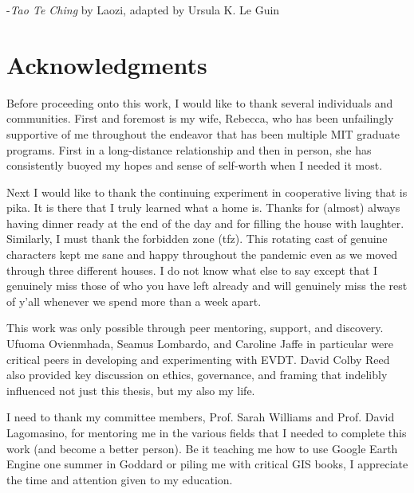 \hspace{40mm}-\textit{Tao Te Ching} by Laozi, adapted by Ursula K. Le Guin


\normalsize
\vfill
\hspace{0pt}

\cleardoublepage

\section*{Acknowledgments}

 

Before proceeding onto this work, I would like to thank several individuals and communities. First and foremost is my wife, Rebecca, who has been unfailingly supportive of me throughout the endeavor that has been multiple MIT graduate programs. First in a long-distance relationship and then in person, she has consistently buoyed my hopes and sense of self-worth when I needed it most.

Next I would like to thank the continuing experiment in cooperative living that is pika. It is there that I truly learned what a home is. Thanks for (almost) always having dinner ready at the end of the day and for filling the house with laughter. Similarly, I must thank the forbidden zone (tfz). This rotating cast of genuine characters kept me sane and happy throughout the pandemic even as we moved through three different houses. I do not know what else to say except that I genuinely miss those of who you have left already and will genuinely miss the rest of y'all whenever we spend more than a week apart.


This work was only possible through peer mentoring, support, and discovery. Ufuoma Ovienmhada, Seamus Lombardo, and Caroline Jaffe in particular were critical peers in developing and experimenting with EVDT. David Colby Reed also provided key discussion on ethics, governance, and framing that indelibly influenced not just this thesis, but my also my life.

I need to thank my committee members, Prof. Sarah Williams and Prof. David Lagomasino, for mentoring me in the various fields that I needed to complete this work (and become a better person). Be it teaching me how to use Google Earth Engine one summer in Goddard or piling me with critical GIS books, I appreciate the time and attention given to my education.

